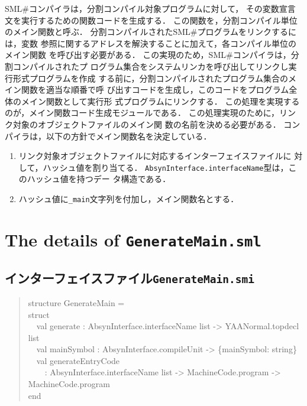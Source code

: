 \documentclass{jbook}
\newif\ifjp
\newcommand{\txt}[2]{#2}
\newcommand{\smlsharp}{SML\#}
\newcommand{\code}[1]{\mbox{\large\tt #1}}
\newcommand{\myem}{\mbox{\ \ }}
\newenvironment{program}{\begin{quote}\begin{tt}}%
                        {\end{tt}\end{quote}}
\begin{document}
	\smlsharp{}コンパイラは，分割コンパイル対象プログラムに対して，
その変数宣言文を実行するための関数コードを生成する．
	この関数を，分割コンパイル単位のメイン関数と呼ぶ．
	分割コンパイルされた\smlsharp{}プログラムをリンクするには，変数
参照に関するアドレスを解決することに加えて，各コンパイル単位のメイン関数
を呼び出す必要がある．
	この実現のため，\smlsharp{}コンパイラは，分割コンパイルされたプ
ログラム集合をシステムリンカを呼び出してリンクし実行形式プログラムを作成
する前に，分割コンパイルされたプログラム集合のメイン関数を適当な順番で呼
び出すコードを生成し，このコードをプログラム全体のメイン関数として実行形
式プログラムにリンクする．
	この処理を実現するのが，メイン関数コード生成モジュールである．
	この処理実現のために，リンク対象のオブジェクトファイルのメイン関
数の名前を決める必要がある．
	コンパイラは，以下の方針でメイン関数名を決定している．
\begin{enumerate}
\item リンク対象オブジェクトファイルに対応するインターフェイスファイルに
対して，ハッシュ値を割り当てる．
	\code{AbsynInterface.interfaceName}型は，このハッシュ値を持つデー
タ構造である．
\item ハッシュ値に\code{\_main}文字列を付加し，メイン関数名とする．
\end{enumerate}

\else%
\fi%
	
\section{\txt{\code{GenerateMain.sml}ファイルの詳細}{The details of \code{GenerateMain.sml}}}
\ifjp%

\subsection{インターフェイスファイル\code{GenerateMain.smi}}
\begin{program}
structure GenerateMain = \\
struct\\
\myem  val generate : AbsynInterface.interfaceName list -> YAANormal.topdecl list\\
\myem  val mainSymbol : AbsynInterface.compileUnit -> \{mainSymbol: string\}\\
\myem  val generateEntryCode\\
\myem\myem    : AbsynInterface.interfaceName list -> MachineCode.program -> MachineCode.program\\
end
\end{program}
\end{document}
